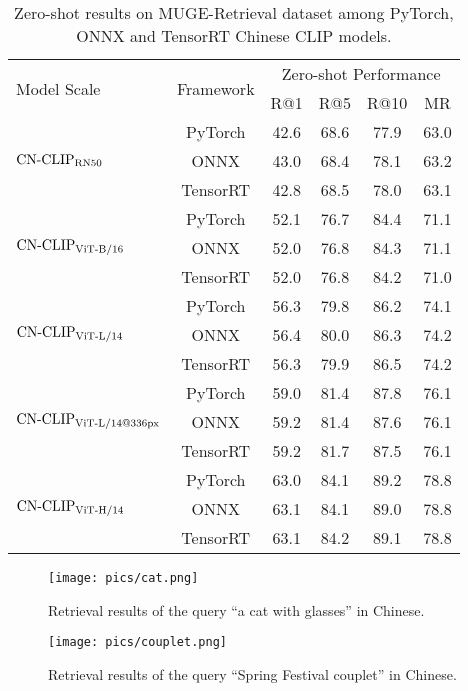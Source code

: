\documentclass[11pt]{article}
\begin{document}
\begin{table*}[t]
\center
\small
\begin{adjustbox}{max width=1.\textwidth}
\begin{tabular}{@{\extracolsep{\fill}}lccccc}
\toprule
  \multirow{2}{*}{Model Scale} & \multirow{2}{*}{Framework}
  &\multicolumn{4}{c}{Zero-shot Performance}
  \\
   &  & R@1 & R@5 & R@10 & MR
  \\
\midrule
  \multirow{3}{*}{$\text{CN-CLIP}\rm_{RN50}$}
  & PyTorch	& 42.6	& 68.6	& 77.9	& 63.0 
  \\
  & ONNX	& 43.0 & 68.4 & 78.1 & 63.2
  \\
  & TensorRT	& 42.8 & 68.5 & 78.0 & 63.1
  \\ \midrule
  \multirow{3}{*}{$\text{CN-CLIP}\rm_{ViT\text{-}B/16}$}
  & PyTorch	& 52.1	& 76.7	& 84.4	& 71.1 
  \\
  & ONNX	& 52.0	& 76.8	& 84.3	& 71.1	
  \\
  & TensorRT	& 52.0	& 76.8	& 84.2	& 71.0
  \\ \midrule
  \multirow{3}{*}{$\text{CN-CLIP}\rm_{ViT\text{-}L/14}$}
  & PyTorch	& 56.3	& 79.8	& 86.2	& 74.1 
  \\
  & ONNX	& 56.4	& 80.0	& 86.3	& 74.2	
  \\
  & TensorRT	& 56.3 & 79.9	& 86.5	& 74.2
  \\ \midrule
  \multirow{3}{*}{$\text{CN-CLIP}\rm_{ViT\text{-}L/14@336px}$}
  & PyTorch	& 59.0	& 81.4	& 87.8	& 76.1
  \\
  & ONNX	& 59.2	& 81.4 & 87.6 & 76.1
  \\
  & TensorRT	& 59.2 & 81.7 & 87.5 & 76.1
  \\ \midrule
  \multirow{3}{*}{$\text{CN-CLIP}\rm_{ViT\text{-}H/14}$}
  & PyTorch	& 63.0	& 84.1	& 89.2	& 78.8 
  \\
  & ONNX	& 63.1	& 84.1	& 89.0	& 78.8	
  \\
  & TensorRT	& 63.1	& 84.2	& 89.1	& 78.8
  \\

\bottomrule
\end{tabular}
\end{adjustbox}
\caption{Zero-shot results on MUGE-Retrieval dataset among PyTorch, ONNX and TensorRT Chinese CLIP models.}
\label{tb:deployment_muge}
\end{table*} 
\begin{figure*}[h] 
    \centering
    \texttt{[image: pics/cat.png]}
    \caption{Retrieval results of the query ``a cat with glasses'' in Chinese.}
    \label{fig:demo_cat}
\end{figure*}

\begin{figure*}[h] 
    \centering
    \texttt{[image: pics/couplet.png]}
    \caption{Retrieval results of the query ``Spring Festival couplet'' in Chinese.}
    \label{fig:demo_couplet}
\end{figure*} 
\end{document}
